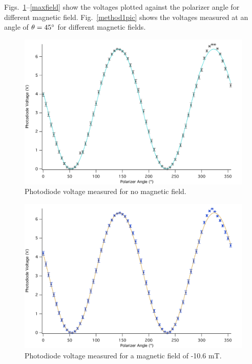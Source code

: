 \documentclass[prb,preprint]{revtex4-1}
\begin{document}
{Figs.~\ref{nofield}--\ref{maxfield} show the voltages plotted against the polarizer angle for different magnetic field. Fig.~\ref{method1pic} shows the voltages measured at an angle of $\theta=45\degree$ for different magnetic fields.
\begin{figure}[h]
\includegraphics[width = 5.8in]{0A.pdf}
\caption{\label{nofield}Photodiode voltage measured for no magnetic field.}
\end{figure}

\begin{figure}
\includegraphics[width = 5.8in]{n1A.pdf}
\caption{\label{neg}Photodiode voltage measured for a magnetic field of -10.6 mT.}
\end{figure}

}
\end{document}
